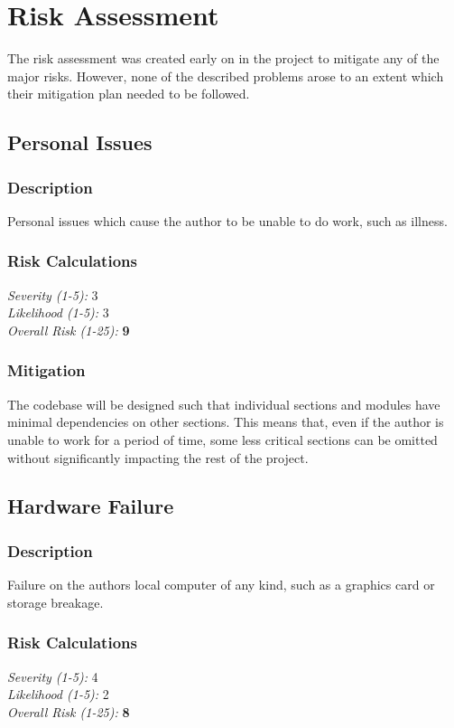 \section{Risk Assessment}
The risk assessment was created early on in the project to mitigate any of the major risks. However, none of the described problems arose to an extent which their mitigation plan needed to be followed.
\subsection{Personal Issues}

\subsubsection{Description}
Personal issues which cause the author to be unable to do work, such as illness.

\subsubsection{Risk Calculations}
\emph{Severity (1-5):} 3 \\
\emph{Likelihood (1-5):} 3 \\
\emph{Overall Risk (1-25):} \textbf{9}

\subsubsection{Mitigation}
The codebase will be designed such that individual sections and modules have minimal dependencies on other sections. This means that, even if the author is unable to work for a period of time, some less critical sections can be omitted without significantly impacting the rest of the project.

\subsection{Hardware Failure}
\subsubsection{Description}
Failure on the authors local computer of any kind, such as a graphics card or storage breakage.

\subsubsection{Risk Calculations}
\emph{Severity (1-5):} 4 \\
\emph{Likelihood (1-5):} 2 \\
\emph{Overall Risk (1-25):} \textbf{8}

